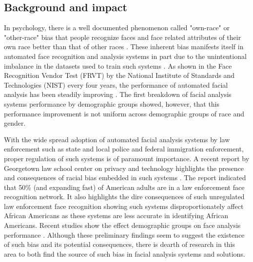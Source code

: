\documentclass[11pt, oneside]{article}
\makeatletter
\let\@internalcite\cite
\def\cite{\def\citeauthoryear##1##2{##1, ##2}\@internalcite}
\makeatother
\begin{document}
\subsection{Background and impact}


In psychology, there is a well documented phenomenon called "own-race" or "other-race" bias that people recognize faces and face related attributes of their own race better than that of other races \cite{furl2002face}. These inherent bias manifests itself in automated face recognition and analysis systems in part due to the unintentional imbalance in the datasets used to train such systems \cite{phillips2011other}. As shown in the Face Recognition Vendor Test (FRVT) by the National Institute of Standards and Technologies (NIST)  every four years, the performance of automated facial analysis has been steadily improving \cite{grother2010report}. The first breakdown of facial analysis systems performance by demographic groups \cite{phillips2011other} showed, however, that this performance improvement is not uniform across demographic groups of race and gender.

With the wide spread adoption of automated facial analysis systems by law enforcement such as state and local police and federal immigration enforcement, proper regulation of such systems is of paramount importance. A recent report by Georgetown law school center on privacy and technology highlights the presence and consequences of racial bias embedded in such systems \cite{garvie2016perpetual}. The report indicated that 50\% (and expanding fast) of American adults are in a law enforcement face recognition network. It also highlights the dire consequences of such unregulated law enforcement face recognition showing such systems disproportionately affect African Americans as these systems are less accurate in identifying African Americans. Recent studies show the effect demographic groups on face analysis performance \cite{han2015demographic} \cite{farinella2012demographic} \cite{klare2012face}. Although these preliminary findings seem to suggest the existence of such bias and its potential consequences, there is dearth of research in this area to both find the source of such bias in facial analysis systems and solutions. 
\end{document}
